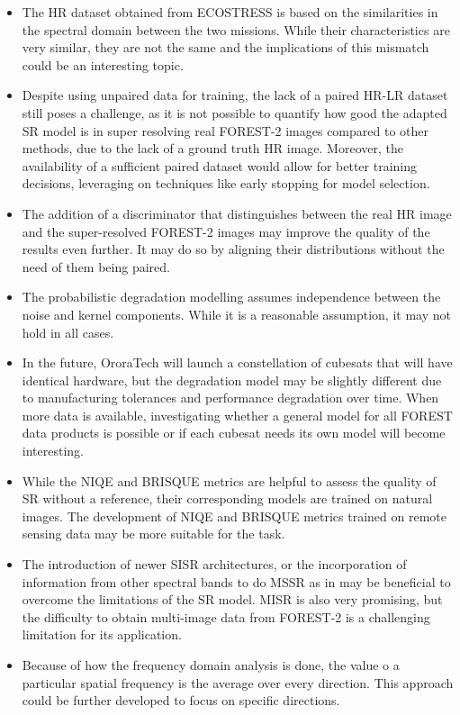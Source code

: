 \begin{itemize}

    \item The HR dataset obtained from ECOSTRESS is based on the similarities in the spectral domain between the two missions. While their characteristics are very similar, they are not the same and the implications of this mismatch could be an interesting topic.
    \item Despite using unpaired data for training, the lack of a paired HR-LR dataset still poses a challenge, as it is not possible to quantify how good the adapted SR model is in super resolving real FOREST-2 images compared to other methods, due to the lack of a ground truth HR image. Moreover, the availability of a sufficient paired dataset would allow for better training decisions, leveraging on techniques like early stopping for model selection. 
    \item The addition of a discriminator that distinguishes between the real HR image and the super-resolved FOREST-2 images may improve the quality of the results even further. It may do so by aligning their distributions without the need of them being paired.
    \item The probabilistic degradation modelling assumes independence between the noise and kernel components. While it is a reasonable assumption, it may not hold in all cases.
    \item In the future, OroraTech will launch a constellation of cubesats that will have identical hardware, but the degradation model may be slightly different due to manufacturing tolerances and performance degradation over time. When more data is available, investigating whether a general model for all FOREST data products is possible or if each cubesat needs its own model will become interesting.
    \item While the NIQE and BRISQUE metrics are helpful to assess the quality of SR without a reference, their corresponding models are trained on natural images. The development of NIQE and BRISQUE metrics trained on remote sensing data may be more suitable for the task.
    \item The introduction of newer SISR architectures, or the incorporation of information from other spectral bands to do MSSR as in \cite{myself2023} may be beneficial to overcome the limitations of the SR model. MISR is also very promising, but the difficulty to obtain multi-image data from FOREST-2 is a challenging limitation for its application.
    \item Because of how the frequency domain analysis is done, the value o a particular spatial frequency is the average over every direction. This approach could be further developed to focus on specific directions.
\end{itemize}